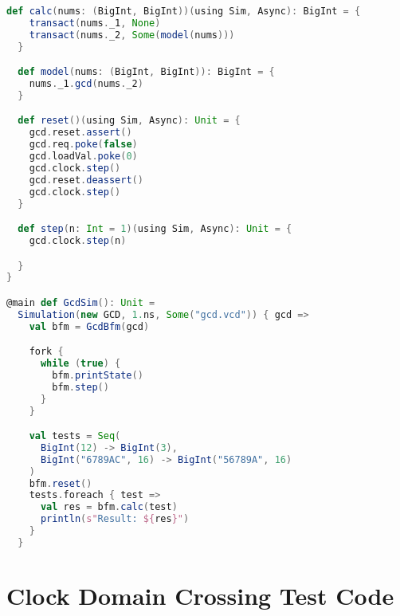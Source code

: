 \begin{lstlisting}[language=scala, captionpos=b, caption=Test code for the GCD circuit.,label=lst:gcd_test]
  def calc(nums: (BigInt, BigInt))(using Sim, Async): BigInt = {
    transact(nums._1, None)
    transact(nums._2, Some(model(nums)))
  }

  def model(nums: (BigInt, BigInt)): BigInt = {
    nums._1.gcd(nums._2)
  }

  def reset()(using Sim, Async): Unit = {
    gcd.reset.assert()
    gcd.req.poke(false)
    gcd.loadVal.poke(0)
    gcd.clock.step()
    gcd.reset.deassert()
    gcd.clock.step()
  }

  def step(n: Int = 1)(using Sim, Async): Unit = {
    gcd.clock.step(n)

  }
}

@main def GcdSim(): Unit =
  Simulation(new GCD, 1.ns, Some("gcd.vcd")) { gcd =>
    val bfm = GcdBfm(gcd)

    fork {
      while (true) {
        bfm.printState()
        bfm.step()
      }
    }

    val tests = Seq(
      BigInt(12) -> BigInt(3),
      BigInt("6789AC", 16) -> BigInt("56789A", 16) 
    )
    bfm.reset()
    tests.foreach { test =>
      val res = bfm.calc(test)
      println(s"Result: ${res}")
    }
  }

\end{lstlisting}


\section{Clock Domain Crossing Test Code} %

